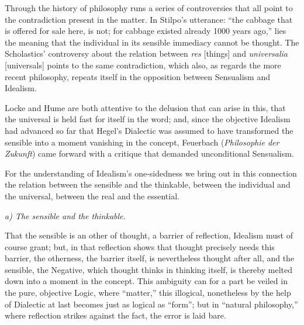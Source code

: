 \documentclass[12pt]{book}
\begin{document}
Through the history of philosophy runs a series of controversies that all point to
the contradiction present in the matter. In Stilpo's utterance: ``the cabbage that
is offered for sale here, is not; for cabbage existed already 1000 years ago,''
lies the meaning that the individual in its sensible immediacy cannot be thought.
The Scholastics' controversy about the relation between \textit{res} [things] and
\textit{universalia} [universals] points to the same contradiction, which also, as
regards the more recent philosophy, repeats itself in the opposition between
Sensualism and Idealism.

Locke and Hume are both attentive to the delusion that can arise in this, that the
universal is held fast for itself in the word; and, since the objective Idealism
had advanced so far that Hegel's Dialectic was assumed to have transformed
the sensible into a moment vanishing in the concept, Feuerbach (\textit{Philosophie
der Zukunft}) came forward with a critique that demanded unconditional Sensualism.

For the understanding of Idealism's one-sidedness we bring out in this connection
the relation between the sensible and the thinkable, between the individual and
the universal, between the real and the essential.

\emph{a) The sensible and the thinkable.}

That the sensible is an other of thought, a barrier of reflection, Idealism must
of course grant; but, in that reflection shows that thought precisely needs this
barrier, the otherness, the barrier itself, is nevertheless thought after all, and
the sensible, the Negative, which thought thinks in thinking itself, is thereby
melted down into a moment in the concept. This ambiguity can for a part be veiled
in the pure, objective Logic, where ``matter,'' this illogical, nonetheless by the
help of Dialectic at last becomes just as logical as ``form''; but in ``natural
philosophy,'' where reflection strikes against the fact, the error is laid bare.
\end{document}

